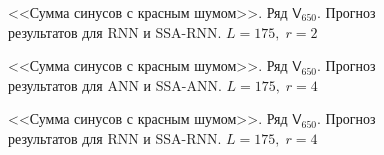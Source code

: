 \documentclass[specialist,
               substylefile = spbu.rtx,
               subf,href,colorlinks=true, 12p]{disser}
\begin{document}
\begin{figure}[H]
	\captionsetup{justification=centering}
	\caption{<<Сумма синусов с красным шумом>>. Ряд $\mathsf{V}_{650}$. Прогноз результатов для RNN и SSA-RNN. $L = 175, \; r = 2$}
	\label{serr_r2_res_rnn}
\end{figure}

\begin{figure}[H]
	\captionsetup{justification=centering}
	\caption{<<Сумма синусов с красным шумом>>. Ряд $\mathsf{V}_{650}$. Прогноз результатов для ANN и SSA-ANN. $L = 175, \; r = 4$}
	\label{serr_r4_res_ann}
\end{figure}

\begin{figure}[H]
	\captionsetup{justification=centering}
	\caption{<<Сумма синусов с красным шумом>>. Ряд $\mathsf{V}_{650}$. Прогноз результатов для RNN и SSA-RNN. $L = 175, \; r = 4$}
	\label{serr_r4_res_rnn}
\end{figure}
\end{document}
